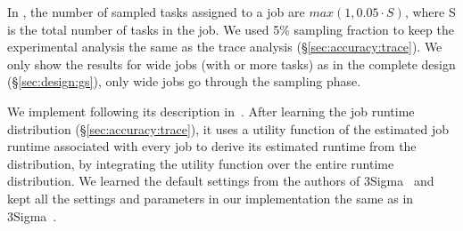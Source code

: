 {In \lTechnique, the number of sampled tasks assigned to a job are
$max(1, 0.05 \cdot S)$, where S is the total number of tasks in the
job. We used 5\% sampling fraction to keep the experimental analysis
the same as the trace analysis
(\S\ref{sec:accuracy:trace}). {We only show the results for wide
  jobs (with \thinLimit or more tasks) as in the complete \slearn design (\S\ref{sec:design:gs}), only
  wide jobs go through the sampling phase.
  }


We implement \primarybasepredict following its description in~\cite{3Sigma}.
After learning the job runtime distribution (\S\ref{sec:accuracy:trace}),
it uses a utility function of the estimated job runtime
associated with every job to derive its estimated runtime from the
distribution, by integrating the utility function
over the entire runtime distribution.
We learned the default settings
from the authors of 3Sigma~\cite{3Sigma} and kept all the settings
and parameters in our implementation the same 
as in 3Sigma~\cite{3Sigma}.

}
